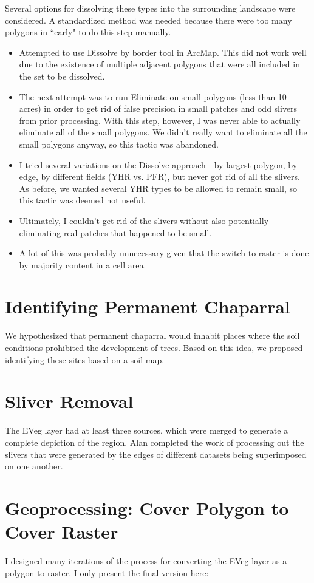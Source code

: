 Several options for dissolving these types into the surrounding landscape were considered. A standardized method was needed because there were too many polygons in ``early" to do this step manually.
\begin{itemize}
\item Attempted to use Dissolve by border tool in ArcMap. This did not work well due to the existence of multiple adjacent polygons that were all included in the set to be dissolved.
\item The next attempt was to run Eliminate on small polygons (less than 10 acres) in order to get rid of false precision in small patches and odd slivers from prior processing. With this step, however, I was never able to actually eliminate all of the small polygons. We didn't really want to eliminate all the small polygons anyway, so this tactic was abandoned.
\item I tried several variations on the Dissolve approach - by largest polygon, by edge, by different fields (YHR vs. PFR), but never got rid of all the slivers. As before, we wanted several YHR types to be allowed to remain small, so this tactic was deemed not useful.
\item Ultimately, I couldn't get rid of the slivers without also potentially eliminating real patches that happened to be small.
\item A lot of this was probably unnecessary given that the switch to raster is done by majority content in a cell area.
\end{itemize}

\section{Identifying Permanent Chaparral}
We hypothesized that permanent chaparral would inhabit places where the soil conditions prohibited the development of trees. Based on this idea, we proposed identifying these sites based on a soil map.

\section{Sliver Removal}
The EVeg layer had at least three sources, which were merged to generate a complete depiction of the region. Alan completed the work of processing out the slivers that were generated by the edges of different datasets being superimposed on one another.


\section{Geoprocessing: Cover Polygon to Cover Raster}
I designed many iterations of the process for converting the EVeg layer as a polygon to raster. I only present the final version here:

